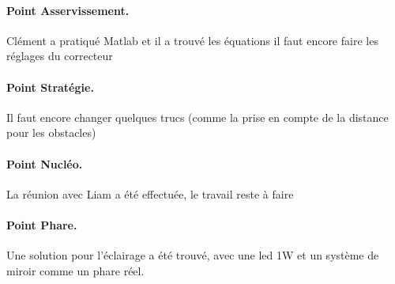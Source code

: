 \documentclass[a4paper,10pt]{report}
\begin{document}
\begin{spacing}{1.5}
\paragraph{Point Asservissement.} Clément a pratiqué Matlab et il a trouvé les
équations il faut encore faire les réglages du correcteur

\paragraph{Point Stratégie.} Il faut encore changer quelques trucs (comme la
prise en compte de la distance pour les obstacles)

\paragraph{Point Nucléo.} La réunion avec Liam a été effectuée, le travail reste
à faire

\paragraph{Point Phare.} Une solution pour l'éclairage a été trouvé, avec une
led 1W et un système de miroir comme un phare réel.

\newpage
\end{spacing}
\end{document}
